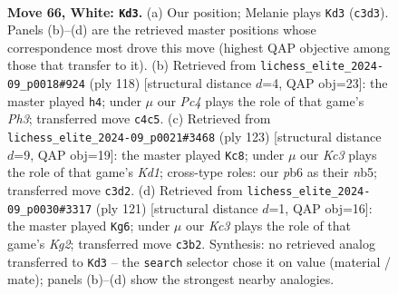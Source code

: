 \documentclass[11pt]{article}
\begin{document}
\clearpage

\begin{figure}[p]\centering
\begin{subfigure}{0.46\textwidth}\centering
\resizebox{\linewidth}{!}{%
\newchessgame
\chessboard[
  setfen={8/7k/pp6/8/q1P5/2K5/8/8 w - - 0 66},
  showmover=false,
  pgfstyle=straightmove, color=movearrow, markmove={c3-d3}
]}
\caption{}
\end{subfigure}\hfill
\begin{subfigure}{0.46\textwidth}\centering
\resizebox{\linewidth}{!}{%
\newchessgame
\chessboard[
  setfen={8/8/3k4/5q1p/8/4K2P/8/8 w - - 0 60},
  showmover=false,
  pgfstyle=straightmove, color=movearrow, markmove={h3-h4}
]}
\caption{}
\end{subfigure}
\\[4pt]
\begin{subfigure}{0.46\textwidth}\centering
\resizebox{\linewidth}{!}{%
\newchessgame
\chessboard[
  setfen={3k4/5Q2/8/1N5p/7P/5K2/8/8 b - - 8 62},
  showmover=false,
  pgfstyle=straightmove, color=movearrow, markmove={d8-c8}
]}
\caption{}
\end{subfigure}\hfill
\begin{subfigure}{0.46\textwidth}\centering
\resizebox{\linewidth}{!}{%
\newchessgame
\chessboard[
  setfen={8/6k1/4Qp2/8/5PP1/8/6K1/8 b - - 1 61},
  showmover=false,
  pgfstyle=straightmove, color=movearrow, markmove={g7-g6}
]}
\caption{}
\end{subfigure}
\caption{\textbf{Move 66, White: \texttt{Kd3}.} (a) Our position; Melanie plays \texttt{Kd3} (\texttt{c3d3}). Panels (b)--(d) are the retrieved master positions whose correspondence most drove this move (highest QAP objective among those that transfer to it). (b) Retrieved from \texttt{lichess\_elite\_2024-09\_p0018\#924} (ply 118) [structural distance $d$=4, QAP obj=23]: the master played \texttt{h4}; under $\mu$ our \emph{Pc4} plays the role of that game's \emph{Ph3}; transferred move \texttt{c4c5}. (c) Retrieved from \texttt{lichess\_elite\_2024-09\_p0021\#3468} (ply 123) [structural distance $d$=9, QAP obj=19]: the master played \texttt{Kc8}; under $\mu$ our \emph{Kc3} plays the role of that game's \emph{Kd1}; cross-type roles: our \emph{p}b6 as their \emph{n}b5; transferred move \texttt{c3d2}. (d) Retrieved from \texttt{lichess\_elite\_2024-09\_p0030\#3317} (ply 121) [structural distance $d$=1, QAP obj=16]: the master played \texttt{Kg6}; under $\mu$ our \emph{Kc3} plays the role of that game's \emph{Kg2}; transferred move \texttt{c3b2}. Synthesis: no retrieved analog transferred to \texttt{Kd3} -- the \texttt{search} selector chose it on value (material / mate); panels (b)--(d) show the strongest nearby analogies.}
\label{fig:thought-m130}
\end{figure}
\end{document}
